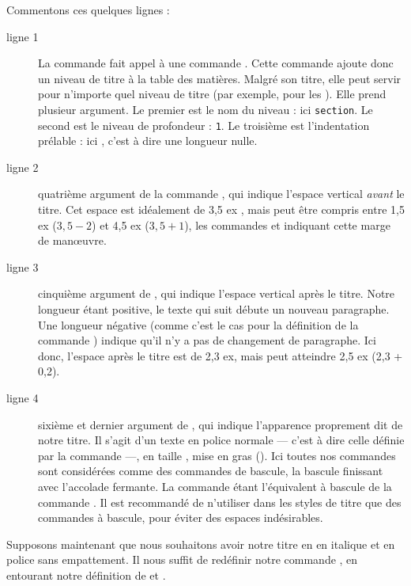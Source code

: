 Commentons ces quelques lignes :

\begin{description}
\item[ligne 1]La commande  fait appel à une commande . Cette commande ajoute donc un niveau de titre à la table des matières. Malgré son titre, elle peut servir pour n'importe quel niveau de titre (par exemple, pour les ). Elle prend plusieur argument. Le premier est le nom du niveau : ici \verb|section|. Le second est le niveau de profondeur : \verb|1|. Le troisième est l'indentation prélable : ici , c'est à dire une longueur nulle.

\item[ligne 2] quatrième argument de la commande , qui indique l'espace vertical \emph{avant} le titre. Cet espace est idéalement de 3,5 ex , mais peut être compris entre 1,5 ex ($3,5 - 2$) et 4,5 ex ($3,5 + 1$), les commandes  et  indiquant cette marge de manœuvre.
\item[ligne 3] cinquième argument de , qui indique l'espace vertical après le titre. Notre longueur étant positive, le texte qui suit débute un nouveau paragraphe. Une longueur négative (comme c'est le cas pour la définition de la commande ) indique qu'il n'y a pas de changement de paragraphe. Ici donc, l'espace après le titre est de 2,3 ex, mais peut atteindre 2,5 ex (2,3 + 0,2).
\item[ligne 4] sixième et dernier argument de , qui indique l'apparence proprement dit de notre titre. Il s'agit d'un texte en police normale --- c'est à dire celle définie par la commande  ---, en taille , mise en gras (). Ici toutes nos commandes sont considérées comme des commandes de bascule, la bascule finissant avec l'accolade fermante. La commande  étant l'équivalent à bascule de la commande . Il est recommandé de n'utiliser dans les styles de titre que des commandes à bascule, pour éviter des espaces indésirables.\label{bfseries}
\end{description}

Supposons maintenant que nous souhaitons avoir notre titre en en italique et en police sans empattement. Il nous suffit de redéfinir notre commande , en entourant notre définition de  et .

